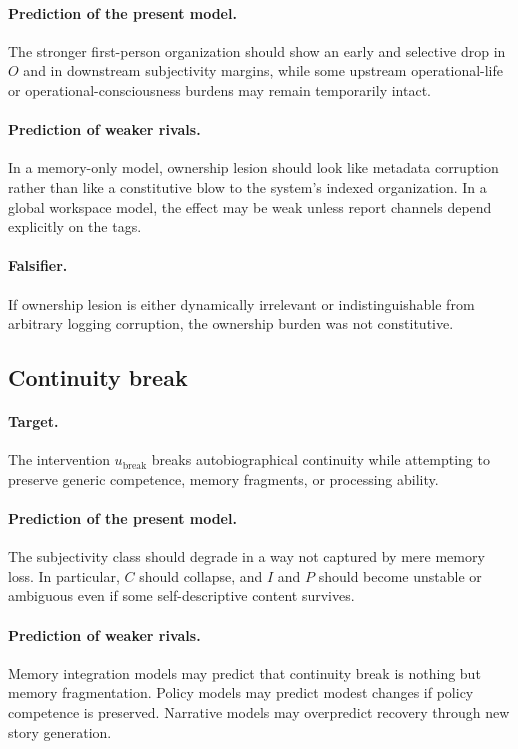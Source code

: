\documentclass[11pt,a4paper]{article}
\theoremstyle{definition}
\newcommand{\SelfIndex}{I}
\newcommand{\OwnField}{O}
\newcommand{\ContField}{C}
\newcommand{\Persp}{P}
\begin{document}
\paragraph{Prediction of the present model.} The stronger first-person organization should show an early and selective drop in $\OwnField$ and in downstream subjectivity margins, while some upstream operational-life or operational-consciousness burdens may remain temporarily intact.

\paragraph{Prediction of weaker rivals.} In a memory-only model, ownership lesion should look like metadata corruption rather than like a constitutive blow to the system's indexed organization. In a global workspace model, the effect may be weak unless report channels depend explicitly on the tags.

\paragraph{Falsifier.} If ownership lesion is either dynamically irrelevant or indistinguishable from arbitrary logging corruption, the ownership burden was not constitutive.

\subsection{Continuity break}
\paragraph{Target.} The intervention $u_{\mathrm{break}}$ breaks auto\-bio\-graphical continuity while attempting to preserve generic competence, memory fragments, or processing ability.

\paragraph{Prediction of the present model.} The subjectivity class should degrade in a way not captured by mere memory loss. In particular, $\ContField$ should collapse, and $\SelfIndex$ and $\Persp$ should become unstable or ambiguous even if some self-descriptive content survives.

\paragraph{Prediction of weaker rivals.} Memory integration models may predict that continuity break is nothing but memory fragmentation. Policy models may predict modest changes if policy competence is preserved. Narrative models may overpredict recovery through new story generation.
\end{document}
